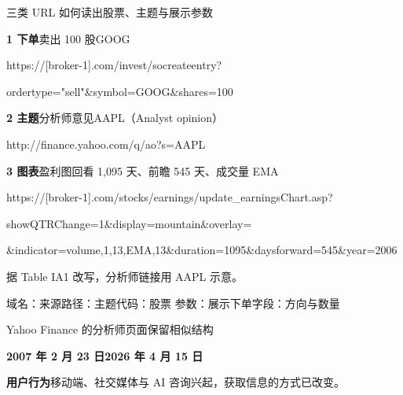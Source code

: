 \newcommand{\udomain}[1]{\textcolor{quiet}{#1}}
\newcommand{\upath}[1]{\textcolor{sampleteal}{#1}}
\newcommand{\ucode}[1]{\textcolor{sampleblue}{#1}}
\newcommand{\uparam}[1]{\textcolor{samplegold}{#1}}
\newcommand{\utrade}[1]{\textcolor{wine}{#1}}
\begin{frame}[label=urls]{三类 URL 如何读出股票、主题与展示参数}
  {\small\textbf{1 下单}\quad\utrade{卖出 100 股}\quad\ucode{GOOG}\par}
  {\fontsize{8}{10}\selectfont\ttfamily
  \udomain{https://[broker-1].com}\upath{/invest/socreateentry?}\par
  \utrade{ordertype="sell"}\ucode{\&symbol=GOOG}\utrade{\&shares=100}\par}
  \smallskip
  {\small\textbf{2 主题}\quad\upath{分析师意见}\quad\ucode{AAPL（Analyst opinion）}\par}
  {\fontsize{8}{10}\selectfont\ttfamily
  \udomain{http://finance.yahoo.com}\upath{/q/ao?}\ucode{s=AAPL}\par}
  \medskip
  {\small\textbf{3 图表}\quad\upath{盈利图}\quad\uparam{回看 1,095 天、前瞻 545 天、成交量 EMA}\par}
  {\fontsize{8}{10}\selectfont\ttfamily
  \udomain{https://[broker-1].com}\upath{/stocks/earnings/update\_earningsChart.asp?}\par
  \uparam{showQTRChange=1\&display=mountain\&overlay=}\par
  \uparam{\&indicator=volume,1,13,EMA,13\&duration=1095\&daysforward=545\&year=2006}\par}
  \smallskip
  {\footnotesize 据 Table IA1 改写，分析师链接用 AAPL 示意。}\par\medskip
  {\footnotesize\udomain{域名：来源}\quad\upath{路径：主题}\quad\ucode{代码：股票}\quad
   \uparam{参数：展示}\quad\utrade{下单字段：方向与数量}}
\end{frame}

\begin{frame}[label=yahoo]{Yahoo Finance 的分析师页面保留相似结构}
  {\centering
  \par}
  {\small\textbf{2007 年 2 月 23 日}\hfill\textbf{2026 年 4 月 15 日}\par}\smallskip
       {\small\textbf{用户行为}\quad 移动端、社交媒体与 AI 咨询兴起，获取信息的方式已改变。}
\end{frame}

